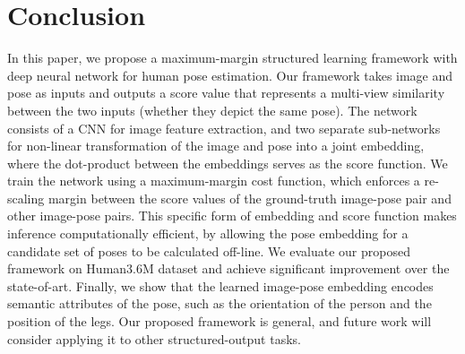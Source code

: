 \documentclass[10pt,twocolumn,letterpaper]{article}
\begin{document}
\section{Conclusion}
\vspace{-0.1in}
In this paper, we propose a maximum-margin structured learning framework with deep neural network for human pose estimation. 
Our framework takes image and pose as inputs and outputs a score value that represents a multi-view similarity between the two inputs (whether they depict  the same pose).
The network consists of a CNN for image feature extraction, and two separate sub-networks for non-linear transformation of the image and pose into a joint embedding, where the dot-product between the embeddings  serves as the score function.
We train the network using a maximum-margin cost function, which enforces a re-scaling margin between the score values of the ground-truth image-pose pair and other image-pose pairs.
%
%
%
This specific form of embedding and score function makes inference computationally efficient, by allowing the pose embedding for a candidate set of poses to be calculated off-line.
%
%
%
%
%
We evaluate our proposed framework on Human3.6M dataset and achieve significant improvement over the state-of-art.
Finally, we show that the learned image-pose embedding encodes semantic attributes of the pose, such as the orientation of the person and the position of the legs.
%
Our proposed framework is general, and future work will consider applying it to other structured-output tasks.
%
%
 
%
 
%
%
%
   
%
%
%

{\small


} 
 
\end{document}
